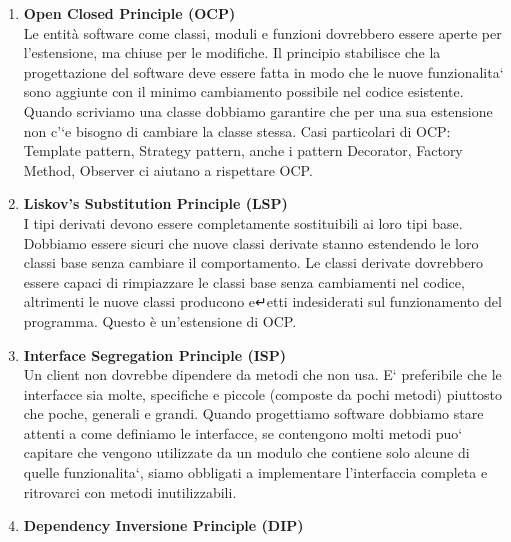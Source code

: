 \documentclass[a4paper, oneside]{book}
\begin{document}
\begin{enumerate}
        \item \textbf{Open Closed Principle (OCP)}\\
Le entità software come classi, moduli e funzioni dovrebbero essere aperte per l'estensione, ma chiuse per le modifiche. Il principio stabilisce che la progettazione del software deve essere fatta in modo che le nuove funzionalita` sono aggiunte con il minimo cambiamento possibile nel codice esistente. Quando scriviamo una classe dobbiamo garantire che per una sua estensione non c'`e bisogno di cambiare la classe stessa. Casi particolari di OCP: Template pattern, Strategy pattern, anche i pattern Decorator, Factory Method, Observer ci aiutano a rispettare OCP.
        \item \textbf{Liskov's Substitution Principle (LSP)}\\
I tipi derivati devono essere completamente sostituibili ai loro tipi base. Dobbiamo essere sicuri che nuove classi derivate stanno estendendo le loro classi base senza cambiare il comportamento. Le classi derivate dovrebbero essere capaci di rimpiazzare le classi base senza cambiamenti nel codice, altrimenti le nuove classi producono e↵etti indesiderati sul funzionamento del programma. Questo è un'estensione di OCP.
        \item \textbf{Interface Segregation Principle (ISP)}\\
Un client non dovrebbe dipendere da metodi che non usa. E` preferibile che le interfacce sia molte, specifiche e piccole (composte da pochi metodi) piuttosto che poche, generali e grandi. Quando progettiamo software dobbiamo stare attenti a come definiamo le interfacce, se contengono molti metodi puo` capitare che vengono utilizzate da un modulo che contiene solo alcune di quelle funzionalita`, siamo obbligati a implementare l'interfaccia completa e ritrovarci con metodi inutilizzabili.
        \item \textbf{Dependency Inversione Principle (DIP)}\\

\end{enumerate}
\end{document}
